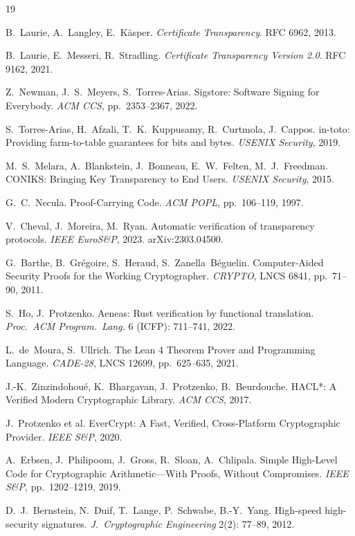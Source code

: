 \documentclass[10pt,twocolumn]{article}
\begin{document}
\begin{thebibliography}{19}\scriptsize
\setlength{\itemsep}{1pt}

 B.~Laurie, A.~Langley, E.~K\"asper.
\emph{Certificate Transparency}. RFC 6962, 2013.

 B.~Laurie, E.~Messeri, R.~Stradling.
\emph{Certificate Transparency Version 2.0}. RFC 9162, 2021.

 Z.~Newman, J.~S.~Meyers, S.~Torres-Arias.
Sigstore: Software Signing for Everybody.
\emph{ACM CCS}, pp.~2353--2367, 2022.

 S.~Torres-Arias, H.~Afzali, T.~K.~Kuppusamy,
R.~Curtmola, J.~Cappos. in-toto: Providing farm-to-table guarantees for
bits and bytes. \emph{USENIX Security}, 2019.

 M.~S.~Melara, A.~Blankstein, J.~Bonneau,
E.~W.~Felten, M.~J.~Freedman. CONIKS: Bringing Key Transparency to End
Users. \emph{USENIX Security}, 2015.

 G.~C.~Necula. Proof-Carrying Code.
\emph{ACM POPL}, pp.~106--119, 1997.

 V.~Cheval, J.~Moreira, M.~Ryan.
Automatic verification of transparency protocols.
\emph{IEEE EuroS\&P}, 2023. arXiv:2303.04500.

 G.~Barthe, B.~Gr\'egoire, S.~Heraud,
S.~Zanella~B\'eguelin. Computer-Aided Security Proofs for the Working
Cryptographer. \emph{CRYPTO}, LNCS 6841, pp.~71--90, 2011.

 S.~Ho, J.~Protzenko.
Aeneas: Rust verification by functional translation.
\emph{Proc.\ ACM Program.\ Lang.} 6 (ICFP): 711--741, 2022.

 L.~de~Moura, S.~Ullrich.
The Lean 4 Theorem Prover and Programming Language.
\emph{CADE-28}, LNCS 12699, pp.~625--635, 2021.

 J.-K.~Zinzindohou\'e, K.~Bhargavan, J.~Protzenko,
B.~Beurdouche. HACL*: A Verified Modern Cryptographic Library.
\emph{ACM CCS}, 2017.

 J.~Protzenko et al.
EverCrypt: A Fast, Verified, Cross-Platform Cryptographic Provider.
\emph{IEEE S\&P}, 2020.

 A.~Erbsen, J.~Philipoom, J.~Gross, R.~Sloan,
A.~Chlipala. Simple High-Level Code for Cryptographic Arithmetic---With
Proofs, Without Compromises. \emph{IEEE S\&P}, pp.~1202--1219, 2019.

 D.~J.~Bernstein, N.~Duif, T.~Lange, P.~Schwabe,
B.-Y.~Yang. High-speed high-security signatures.
\emph{J.\ Cryptographic Engineering} 2(2): 77--89, 2012.


\end{thebibliography}
\end{document}

